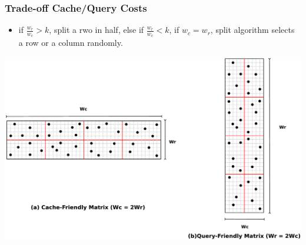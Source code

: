 \documentclass[red]{beamer}
\begin{document}
\begin{frame}
\frametitle{Trade-off Cache/Query Costs}
\begin{itemize}
\item if $\frac{w_r}{w_c} > k$, split a rwo in half, else if $\frac{w_r}{w_c} < k$, if $w_c=w_r$, split algorithm selects a row or a column randomly.
\end{itemize}
\begin{center}
\includegraphics[scale=0.12]{figs/asym_both.eps}
\end{center}
\end{frame}
\end{document}
